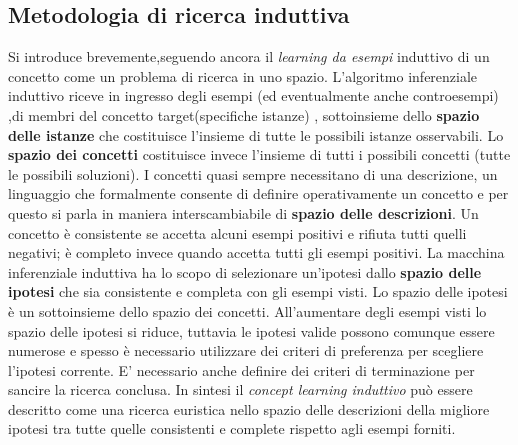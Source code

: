 \subsection{Metodologia di ricerca induttiva}
\label{sub:appindes}
Si introduce brevemente,seguendo ancora \cite{Mic86a} il \textit{learning da esempi} induttivo di un concetto come un problema di ricerca in uno spazio. L'algoritmo inferenziale induttivo riceve in ingresso degli esempi (ed eventualmente anche controesempi) ,di membri del concetto target(specifiche istanze) , sottoinsieme dello \textbf{spazio delle istanze} che costituisce l'insieme di tutte le possibili istanze osservabili. Lo \textbf{spazio dei concetti} costituisce invece l'insieme di tutti i possibili concetti (tutte le possibili soluzioni). I concetti quasi sempre necessitano di una descrizione, un linguaggio che formalmente consente di definire operativamente un concetto e per questo si parla in maniera interscambiabile di \textbf{spazio delle descrizioni}. Un concetto è consistente se accetta alcuni esempi positivi e rifiuta tutti quelli negativi; è completo invece quando accetta tutti gli esempi positivi. La macchina inferenziale induttiva ha lo scopo di selezionare un'ipotesi dallo \textbf{spazio delle ipotesi} che sia consistente e completa con gli esempi visti. Lo spazio delle ipotesi è un sottoinsieme dello spazio dei concetti. All'aumentare degli esempi visti lo spazio delle ipotesi si riduce, tuttavia le ipotesi valide possono comunque essere numerose e spesso è necessario utilizzare dei criteri di preferenza per scegliere l'ipotesi corrente. E' necessario anche definire dei criteri di terminazione per sancire la ricerca conclusa.  In sintesi il \textit{concept learning induttivo} può essere descritto come una ricerca euristica nello spazio delle descrizioni della migliore ipotesi tra tutte quelle consistenti e complete rispetto agli esempi forniti.
